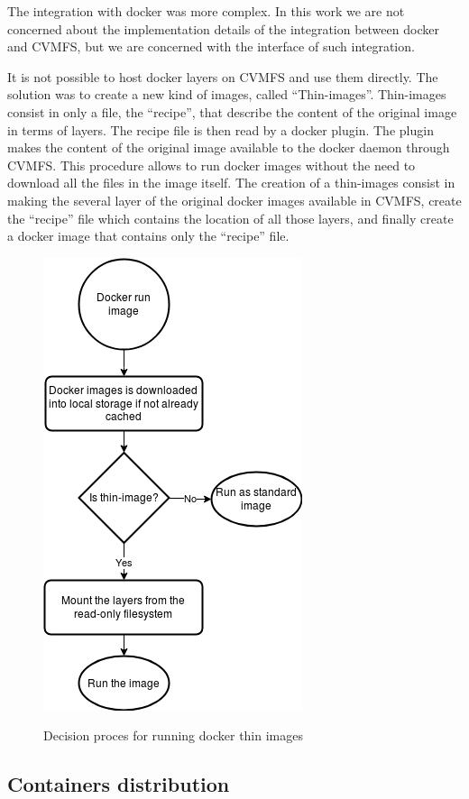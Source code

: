 The integration with docker was more complex. In this work we are not concerned about the implementation details of the integration between docker and CVMFS, but we are concerned with the interface of such integration.

It is not possible to host docker layers on CVMFS and use them directly. The solution was to create a new kind of images, called “Thin-images”.
Thin-images consist in only a file, the “recipe”, that describe the content of the original image in terms of layers.
The recipe file is then read by a docker plugin. The plugin makes the content of the original image available to the docker daemon through CVMFS. This procedure allows to run docker images without the need to download all the files in the image itself.
The creation of a thin-images consist in making the several layer of the original docker images available in CVMFS, create the “recipe” file which contains the location of all those layers, and finally create a docker image that contains only the “recipe” file.

\begin{figure}
\includegraphics{gfx/RunThinImages}
\label{fig:flowchart-run-thin-image}
\caption{Decision proces for running docker thin images}
\end{figure}

\subsection{Containers distribution}
\label{subsec:singularity-docker-distribution}

